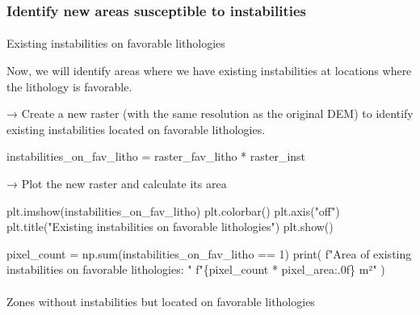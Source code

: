 \documentclass[
  letterpaper,
  DIV=11,
  numbers=noendperiod]{scrartcl}
\makeatletter
\let\oldparagraph\paragraph
\renewcommand{\paragraph}{
    \@ifstar
      \xxxParagraphStar
      \xxxParagraphNoStar
  }
\newcommand{\xxxParagraphStar}[1]{\oldparagraph*{#1}\mbox{}}
\newcommand{\xxxParagraphNoStar}[1]{\oldparagraph{#1}\mbox{}}
\newenvironment{Shaded}{\begin{snugshade}}{\end{snugshade}}
\newcommand{\BuiltInTok}[1]{\textcolor[rgb]{0.00,0.23,0.31}{#1}}
\newcommand{\DecValTok}[1]{\textcolor[rgb]{0.68,0.00,0.00}{#1}}
\newcommand{\NormalTok}[1]{\textcolor[rgb]{0.00,0.23,0.31}{#1}}
\newcommand{\OperatorTok}[1]{\textcolor[rgb]{0.37,0.37,0.37}{#1}}
\newcommand{\SpecialCharTok}[1]{\textcolor[rgb]{0.37,0.37,0.37}{#1}}
\newcommand{\SpecialStringTok}[1]{\textcolor[rgb]{0.13,0.47,0.30}{#1}}
\newcommand{\StringTok}[1]{\textcolor[rgb]{0.13,0.47,0.30}{#1}}
\makeatother
\begin{document}
\subsubsection{Identify new areas susceptible to
instabilities}\label{identify-new-areas-susceptible-to-instabilities}

\paragraph{Existing instabilities on favorable
lithologies}\label{existing-instabilities-on-favorable-lithologies}

Now, we will identify areas where we have existing instabilities at
locations where the lithology is favorable.

→ Create a new raster (with the same resolution as the original DEM) to
identify existing instabilities located on favorable lithologies.

\begin{Shaded}
\begin{Highlighting}[]
\NormalTok{instabilities\_on\_fav\_litho }\OperatorTok{=}\NormalTok{ raster\_fav\_litho }\OperatorTok{*}\NormalTok{ raster\_inst}
\end{Highlighting}
\end{Shaded}

→ Plot the new raster and calculate its area

\begin{Shaded}
\begin{Highlighting}[]
\NormalTok{plt.imshow(instabilities\_on\_fav\_litho)}
\NormalTok{plt.colorbar()}
\NormalTok{plt.axis(}\StringTok{"off"}\NormalTok{)}
\NormalTok{plt.title(}\StringTok{"Existing instabilities on favorable lithologies"}\NormalTok{)}
\NormalTok{plt.show()}

\NormalTok{pixel\_count }\OperatorTok{=}\NormalTok{ np.}\BuiltInTok{sum}\NormalTok{(instabilities\_on\_fav\_litho }\OperatorTok{==} \DecValTok{1}\NormalTok{)}
\BuiltInTok{print}\NormalTok{(}
    \SpecialStringTok{f"Area of existing instabilities on favorable lithologies: "}
    \SpecialStringTok{f"}\SpecialCharTok{\{}\NormalTok{pixel\_count }\OperatorTok{*}\NormalTok{ pixel\_area}\SpecialCharTok{:.0f\}}\SpecialStringTok{ m²"}
\NormalTok{)}
\end{Highlighting}
\end{Shaded}

\paragraph{Zones without instabilities but located on favorable
lithologies}\label{zones-without-instabilities-but-located-on-favorable-lithologies}
\end{document}
